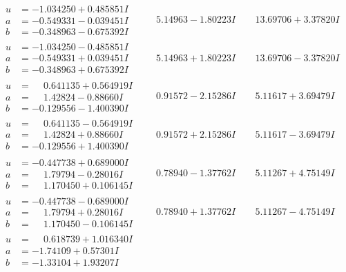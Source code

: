 \documentclass[1p]{elsarticle_modified}
\theoremstyle{definition}
\begin{document}
$$\begin{array}{c|c|c}
\begin{aligned}
u &= -1.034250 + 0.485851 I \\
a &= -0.549331 - 0.039451 I \\
b &= -0.348963 - 0.675392 I\end{aligned}
 & \phantom{-}5.14963 - 1.80223 I & \phantom{-}13.69706 + 3.37820 I \\ \hline\begin{aligned}
u &= -1.034250 - 0.485851 I \\
a &= -0.549331 + 0.039451 I \\
b &= -0.348963 + 0.675392 I\end{aligned}
 & \phantom{-}5.14963 + 1.80223 I & \phantom{-}13.69706 - 3.37820 I \\ \hline\begin{aligned}
u &= \phantom{-}0.641135 + 0.564919 I \\
a &= \phantom{-}1.42824 - 0.88660 I \\
b &= -0.129556 - 1.400390 I\end{aligned}
 & \phantom{-}0.91572 - 2.15286 I & \phantom{-}5.11617 + 3.69479 I \\ \hline\begin{aligned}
u &= \phantom{-}0.641135 - 0.564919 I \\
a &= \phantom{-}1.42824 + 0.88660 I \\
b &= -0.129556 + 1.400390 I\end{aligned}
 & \phantom{-}0.91572 + 2.15286 I & \phantom{-}5.11617 - 3.69479 I \\ \hline\begin{aligned}
u &= -0.447738 + 0.689000 I \\
a &= \phantom{-}1.79794 - 0.28016 I \\
b &= \phantom{-}1.170450 + 0.106145 I\end{aligned}
 & \phantom{-}0.78940 - 1.37762 I & \phantom{-}5.11267 + 4.75149 I \\ \hline\begin{aligned}
u &= -0.447738 - 0.689000 I \\
a &= \phantom{-}1.79794 + 0.28016 I \\
b &= \phantom{-}1.170450 - 0.106145 I\end{aligned}
 & \phantom{-}0.78940 + 1.37762 I & \phantom{-}5.11267 - 4.75149 I \\ \hline\begin{aligned}
u &= \phantom{-}0.618739 + 1.016340 I \\
a &= -1.74109 + 0.57301 I \\
b &= -1.33104 + 1.93207 I\end{aligned}

\end{array}$$
\end{document}
